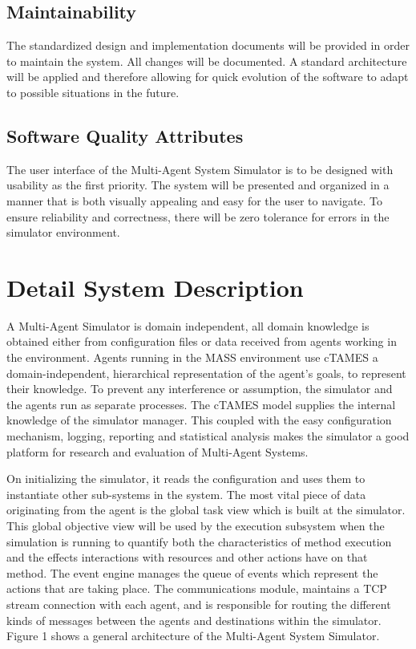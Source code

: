 \documentclass{article}
\begin{document}
\subsection{Maintainability}

The standardized design and implementation documents will be provided in order to maintain the system. All changes will be documented. A standard architecture will be applied and therefore allowing for quick evolution of the software to adapt to possible situations in the future.

\subsection{Software Quality Attributes}

The user interface of the Multi-Agent System Simulator is to be designed with usability as the first priority. The system will be presented and organized in a manner that is both visually appealing and easy for the user to navigate. To ensure reliability and correctness, there will be zero tolerance for errors in the simulator environment. 

\newpage
\section{Detail System Description}

A Multi-Agent Simulator is domain independent, all domain knowledge is obtained either from configuration files or data received from agents working in the environment. Agents running in the MASS environment use cTAMES a domain-independent, hierarchical representation of the agent's goals, to represent their knowledge. To prevent any interference or assumption, the simulator and the agents run as separate processes. The cTAMES model supplies the internal knowledge of the simulator manager. This coupled with the easy configuration mechanism, logging, reporting and statistical analysis makes the simulator a good platform  for research and evaluation of Multi-Agent Systems.

On initializing the simulator, it reads the configuration and uses them to instantiate other sub-systems in the system. The most vital piece of data originating from the agent is the global task view which is built at the simulator. This global objective view will be used by the execution subsystem when the simulation is running to quantify  both the characteristics of method execution and the effects interactions with resources and other actions have on that method. The event engine manages the queue of events which represent the actions that are taking place. The communications module, maintains a TCP stream connection with each agent, and is responsible for routing the different kinds of messages between the agents and destinations within the simulator. Figure 1 shows a general architecture of the Multi-Agent System Simulator.
\end{document}
